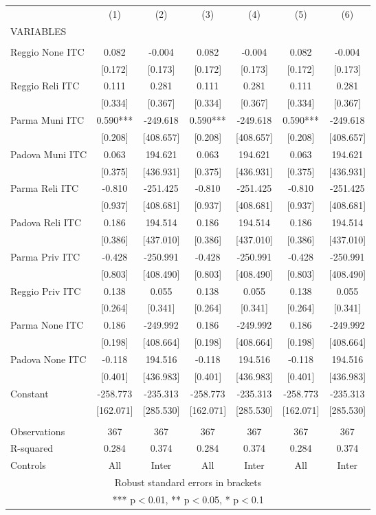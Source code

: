 \begin{tabular}{lcccccc} \hline
 & (1) & (2) & (3) & (4) & (5) & (6) \\
VARIABLES &  &  &  &  &  &  \\ \hline
 &  &  &  &  &  &  \\
Reggio None ITC & 0.082 & -0.004 & 0.082 & -0.004 & 0.082 & -0.004 \\
 & [0.172] & [0.173] & [0.172] & [0.173] & [0.172] & [0.173] \\
Reggio Reli ITC & 0.111 & 0.281 & 0.111 & 0.281 & 0.111 & 0.281 \\
 & [0.334] & [0.367] & [0.334] & [0.367] & [0.334] & [0.367] \\
Parma Muni ITC & 0.590*** & -249.618 & 0.590*** & -249.618 & 0.590*** & -249.618 \\
 & [0.208] & [408.657] & [0.208] & [408.657] & [0.208] & [408.657] \\
Padova Muni ITC & 0.063 & 194.621 & 0.063 & 194.621 & 0.063 & 194.621 \\
 & [0.375] & [436.931] & [0.375] & [436.931] & [0.375] & [436.931] \\
Parma Reli ITC & -0.810 & -251.425 & -0.810 & -251.425 & -0.810 & -251.425 \\
 & [0.937] & [408.681] & [0.937] & [408.681] & [0.937] & [408.681] \\
Padova Reli ITC & 0.186 & 194.514 & 0.186 & 194.514 & 0.186 & 194.514 \\
 & [0.386] & [437.010] & [0.386] & [437.010] & [0.386] & [437.010] \\
Parma Priv ITC & -0.428 & -250.991 & -0.428 & -250.991 & -0.428 & -250.991 \\
 & [0.803] & [408.490] & [0.803] & [408.490] & [0.803] & [408.490] \\
Reggio Priv ITC & 0.138 & 0.055 & 0.138 & 0.055 & 0.138 & 0.055 \\
 & [0.264] & [0.341] & [0.264] & [0.341] & [0.264] & [0.341] \\
Parma None ITC & 0.186 & -249.992 & 0.186 & -249.992 & 0.186 & -249.992 \\
 & [0.198] & [408.664] & [0.198] & [408.664] & [0.198] & [408.664] \\
Padova None ITC & -0.118 & 194.516 & -0.118 & 194.516 & -0.118 & 194.516 \\
 & [0.401] & [436.983] & [0.401] & [436.983] & [0.401] & [436.983] \\
Constant & -258.773 & -235.313 & -258.773 & -235.313 & -258.773 & -235.313 \\
 & [162.071] & [285.530] & [162.071] & [285.530] & [162.071] & [285.530] \\
 &  &  &  &  &  &  \\
Observations & 367 & 367 & 367 & 367 & 367 & 367 \\
R-squared & 0.284 & 0.374 & 0.284 & 0.374 & 0.284 & 0.374 \\
 Controls & All & Inter & All & Inter & All & Inter \\ \hline
\multicolumn{7}{c}{ Robust standard errors in brackets} \\
\multicolumn{7}{c}{ *** p$<$0.01, ** p$<$0.05, * p$<$0.1} \\
\end{tabular}
